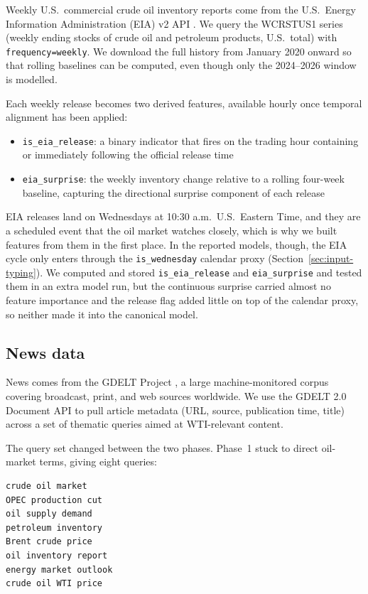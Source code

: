 Weekly U.S.\ commercial crude oil inventory reports come from the U.S.\ Energy Information Administration (EIA) v2 API \citep{eia}. We query the WCRSTUS1 series (weekly ending stocks of crude oil and petroleum products, U.S.\ total) with \texttt{frequency=weekly}. We download the full history from January 2020 onward so that rolling baselines can be computed, even though only the 2024--2026 window is modelled.

Each weekly release becomes two derived features, available hourly once temporal alignment has been applied:

\begin{itemize}
  \item \texttt{is\_eia\_release}: a binary indicator that fires on the trading hour containing or immediately following the official release time
  \item \texttt{eia\_surprise}: the weekly inventory change relative to a rolling four-week baseline, capturing the directional surprise component of each release
\end{itemize}

EIA releases land on Wednesdays at 10:30 a.m.\ U.S.\ Eastern Time, and they are a scheduled event that the oil market watches closely, which is why we built features from them in the first place. In the reported models, though, the EIA cycle only enters through the \texttt{is\_wednesday} calendar proxy (Section~\ref{sec:input-typing}). We computed and stored \texttt{is\_eia\_release} and \texttt{eia\_surprise} and tested them in an extra model run, but the continuous surprise carried almost no feature importance and the release flag added little on top of the calendar proxy, so neither made it into the canonical model.

\subsection{News data}\label{sec:news-data}

News comes from the GDELT Project \citep{leetaru_schrodt2013}, a large machine-monitored corpus covering broadcast, print, and web sources worldwide. We use the GDELT 2.0 Document API to pull article metadata (URL, source, publication time, title) across a set of thematic queries aimed at WTI-relevant content.

The query set changed between the two phases. Phase~1 stuck to direct oil-market terms, giving eight queries:

\begin{lstlisting}
crude oil market
OPEC production cut
oil supply demand
petroleum inventory
Brent crude price
oil inventory report
energy market outlook
crude oil WTI price
\end{lstlisting}

